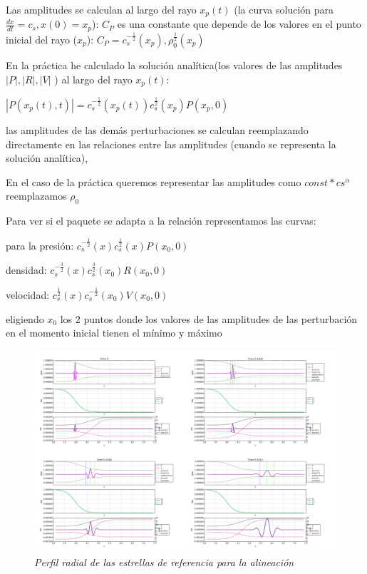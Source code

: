 \documentclass{article}
\begin{document}
\begin{description}

\item Las amplitudes se calculan al largo del rayo  $x_p(t)$ (la curva solución para  $\frac{dx}{dt} = c_s, x(0) = x_p$): $C_P$ es una constante que depende de los valores en el punto inicial del rayo ($x_p$): $C_P = c_s^{-\frac{1}{2}}(x_p) , \rho_0^{\frac{1}{2}}(x_p)$

\item En la práctica he calculado la solución analítica(los valores de las amplitudes $|P|, |R|, |V|$ ) al largo del rayo $x_p(t)$:
\item $|P(x_p(t),t)| = c_s^{-\frac{1}{2}}(x_p(t)) c_s^{\frac{1}{2}}(x_p) P(x_p,0)  $
\item las amplitudes de las demás perturbaciones se calculan reemplazando directamente en las relaciones entre las amplitudes (cuando se representa la solución analítica), 
\item En el caso de la práctica queremos representar las amplitudes como $const * cs^{\alpha} $ reemplazamos $\rho_0$
\item Para ver si el paquete se adapta a la relación representamos las curvas:
\item para la presión: $ c_s^{-\frac{1}{2}}(x) c_s^{\frac{1}{2}}(x) P(x_0,0) $
\item densidad: $ c_s^{-\frac{3}{2}}(x) c_s^{\frac{3}{2}}(x_0) R(x_0,0)  $ 
\item velocidad: $ c_s^{\frac{1}{2}}(x) c_s^{-\frac{1}{2}}(x_0) V(x_0,0)  $ 
\item eligiendo $x_0$ los 2 puntos donde  los valores de las amplitudes de las perturbación en el momento inicial tienen el mínimo y máximo 


\begin{figure}[!ht]
 \centering
 \includegraphics[scale=0.2]{mainInhom1.png}
 \caption{\emph{Perfil radial de las estrellas de referencia para la alineación}}
\end{figure}


\end{description}
\end{document}
